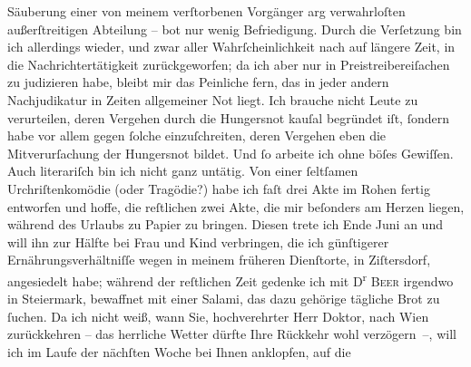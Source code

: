 \begin{ledgroupsized}[t]{13cm}
               Säuberung einer von meinem verſtorbenen Vorgänger arg verwahrloſten außerſtreitigen Abteilung – bot
               nur wenig Befriedigung.\pend
           \pstart
           Durch die Verſetzung bin ich allerdings wieder, und zwar aller Wahrſcheinlichkeit
               nach auf längere Zeit, in die Nachrichtertätigkeit zurückgeworfen; da ich aber nur in
               Preistreibereiſachen zu judizieren habe, bleibt mir das Peinliche fern, das in jeder
               andern Nachjudikatur in Zeiten allgemeiner Not liegt. Ich brauche nicht Leute zu
               verurteilen, deren Vergehen durch die Hungersnot kauſal begründet iſt, ſondern habe
               vor allem gegen ſolche einzuſchreiten, deren Vergehen {\pb}eben die Mitverurſachung der Hungersnot bildet. Und ſo arbeite ich ohne böſes
               Gewiſſen.\pend
           \pstart
           Auch literariſch bin ich nicht ganz untätig. Von einer ſeltſamen Urchriſtenkomödie (oder Tragödie?) habe ich
               faſt drei Akte im Rohen fertig entworfen und hoffe, die reſtlichen zwei Akte, die mir
               beſonders am Herzen liegen, während des Urlaubs zu Papier zu bringen. Diesen trete
               ich Ende Juni an und will ihn zur Hälfte bei Frau und Kind verbringen, die ich günſtigerer Ernährungsverhältniſſe
               wegen in meinem früheren Dienſtorte, in Ziſtersdorf, angesiedelt habe; während der reſtlichen Zeit gedenke ich mit
                  D\textsuperscript{r}{ }\textsc{Beer} irgendwo in Steiermark, bewaffnet mit einer
               Salami, das dazu gehörige tägliche {\pb}Brot zu
               ſuchen.\pend
           \pstart
           Da ich nicht weiß, wann Sie, hochverehrter Herr Doktor, nach Wien zurückkehren – das herrliche Wetter dürfte Ihre Rückkehr
               wohl verzögern –, will ich im Laufe der nächſten Woche bei Ihnen anklopfen, auf die

\end{ledgroupsized}
